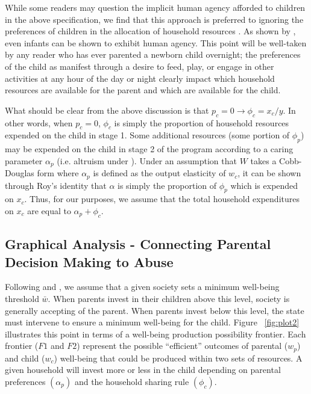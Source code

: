 \documentclass[1p, review]{elsarticle}\usepackage[]{graphicx}\usepackage[]{color}
\begin{document}
While some readers may question the implicit human agency afforded to children in the above specification, we find that this approach is preferred to ignoring the preferences of children in the allocation of household resources \citep[as in, e.g.][]{Blundell2007}. As shown by \citet{Sodian2004}, even infants can be shown to exhibit human agency. This point will be well-taken by any reader who has ever parented a newborn child overnight; the preferences of the child as manifest through a desire to feed, play, or engage in other activities at any hour of the day or night clearly impact which household resources are available for the parent and which are available for the child. 

What should be clear from the above discussion is that $p_c=0 \rightarrow \phi_c=x_c/y$. In other words, when $p_c=0$, $\phi_c$ is simply the proportion of household resources expended on the child in stage 1. Some additional resources (some portion of $\phi_p$) may be expended on the child in stage 2 of the program according to a caring parameter $\alpha_p$ (i.e. altruism under \citet{Becker1981}). Under an assumption that $W$ takes a Cobb-Douglas form where $\alpha_p$ is defined as the output elasticity of $w_c$, it can be shown through Roy's identity \citep{Roy1947} that $\alpha$ is simply the proportion of $\phi_p$ which is expended on $x_c$. Thus, for our purposes, we assume that the total household expenditures on $x_c$ are equal to $\alpha_p + \phi_c$. 

\subsection{Graphical Analysis - Connecting Parental Decision Making to Abuse}

Following \citet{Brandon2001} and \citet{Brandon1999}, we assume that a given society sets a minimum well-being threshold $\bar{w}$. When parents invest in their children above this level, society is generally accepting of the parent. When parents invest below this level, the state must intervene to ensure a minimum well-being for the child. Figure ~\ref{fig:plot2} illustrates this point in terms of a well-being production possibility frontier. Each frontier ($F1$ and $F2$) represent the possible ``efficient'' outcomes of parental ($w_p$) and child ($w_c$) well-being that could be produced within two sets of resources. A given household will invest more or less in the child depending on parental preferences $(\alpha_p)$ and the household sharing rule $(\phi_c)$. 
\end{document}
